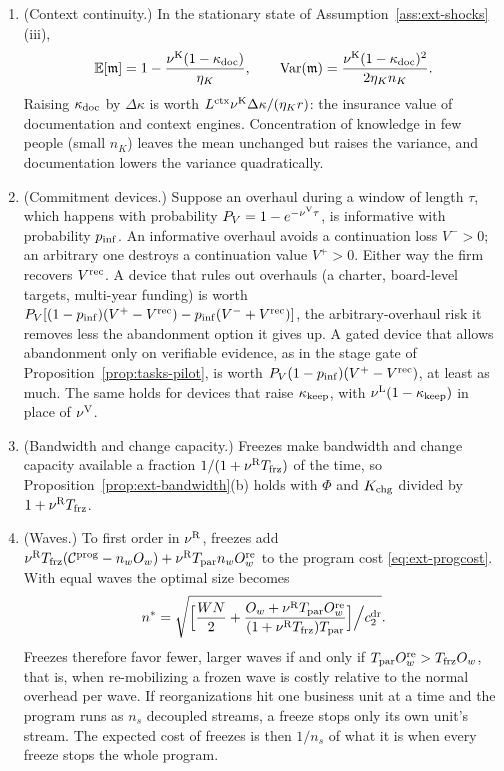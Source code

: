 \begin{proposition}\label{prop:ext-continuity}
\begin{enumerate}
\item[(a)] (Context continuity.) In the stationary state of Assumption~\ref{ass:ext-shocks}(iii),
\[
\mathbb E[\mathfrak m]=1-\frac{\nu^{\rm K}(1-\kappa_{\rm doc})}{\eta_K},\qquad \mathrm{Var}(\mathfrak m)=\frac{\nu^{\rm K}(1-\kappa_{\rm doc})^2}{2\eta_Kn_K}.
\] Raising $\kappa_{\rm doc}$ by $\Delta\kappa$ is worth $L^{\rm ctx}\nu^{\rm K}\Delta\kappa/(\eta_Kr)$: the insurance value of documentation and context engines. Concentration of knowledge in few people (small $n_K$) leaves the mean unchanged but raises the variance, and documentation lowers the variance quadratically.
\item[(b)] (Commitment devices.) Suppose an overhaul during a window of length $\tau$, which happens with probability $P_V=1-e^{-\nu^{\rm V}\tau}$, is informative with probability $p_{\rm inf}$. An informative overhaul avoids a continuation loss $V^->0$; an arbitrary one destroys a continuation value $V^+>0$. Either way the firm recovers $V^{\rm rec}$. A device that rules out overhauls (a charter, board-level targets, multi-year funding) is worth $P_V[(1-p_{\rm inf})(V^+-V^{\rm rec})-p_{\rm inf}(V^-+V^{\rm rec})]$, the arbitrary-overhaul risk it removes less the abandonment option it gives up. A gated device that allows abandonment only on verifiable evidence, as in the stage gate of Proposition~\ref{prop:tasks-pilot}, is worth $P_V(1-p_{\rm inf})(V^+-V^{\rm rec})$, at least as much. The same holds for devices that raise $\kappa_{\rm keep}$, with $\nu^{\rm L}(1-\kappa_{\rm keep})$ in place of $\nu^{\rm V}$.
\item[(c)] (Bandwidth and change capacity.) Freezes make bandwidth and change capacity available a fraction $1/(1+\nu^{\rm R}T_{\rm frz})$ of the time, so Proposition~\ref{prop:ext-bandwidth}(b) holds with $\Phi$ and $K_{\rm chg}$ divided by $1+\nu^{\rm R}T_{\rm frz}$.
\item[(d)] (Waves.) To first order in $\nu^{\rm R}$, freezes add $\nu^{\rm R}T_{\rm frz}(\mathcal C^{\rm prog}-n_wO_w)+\nu^{\rm R}T_{\rm par}n_wO^{\rm re}_w$ to the program cost \eqref{eq:ext-progcost}. With equal waves the optimal size becomes
\[
n^*=\sqrt{\Bigl[\frac{WN}2+\frac{O_w+\nu^{\rm R}T_{\rm par}O^{\rm re}_w}{(1+\nu^{\rm R}T_{\rm frz})T_{\rm par}}\Bigr]\Big/c^{\rm dr}_2}.
\] Freezes therefore favor fewer, larger waves if and only if $T_{\rm par}O^{\rm re}_w>T_{\rm frz}O_w$, that is, when re-mobilizing a frozen wave is costly relative to the normal overhead per wave. If reorganizations hit one business unit at a time and the program runs as $n_s$ decoupled streams, a freeze stops only its own unit's stream. The expected cost of freezes is then $1/n_s$ of what it is when every freeze stops the whole program.
\end{enumerate}
\end{proposition}

